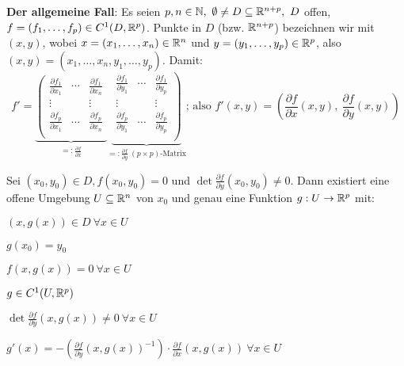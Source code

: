 \documentclass[a4paper,twoside,DIV15,BCOR12mm,chapterprefix=true,headings=twolinechapter]{scrbook}
\begin{document}
\textbf{Der allgemeine Fall}:
Es seien $p,n\in\MdN,\ \emptyset\ne D\subseteq\MdR^{n+p},\ D$ offen, $f=(f_1,\ldots, f_p) \in C^1(D,\mathbb{R}^p)$. Punkte in $D$ (bzw. $\mathbb{R}^{n+p}$) bezeichnen wir mit $(x,y)$, wobei $x=(x_1,\ldots, x_n)\in\mathbb{R}^n$ und $y=(y_1,\ldots, y_p)\in\mathbb{R}^p$, also $(x,y)=(x_1,\dots,x_n,y_1,\ldots,y_p)$. Damit:
$$ f'=
\underbrace{
\left(
\begin{array}{ccc|}
\frac{\partial f_1}{\partial x_1} & \cdots & \frac{\partial f_1}{\partial x_n} \\
\vdots & & \vdots \\
\frac{\partial f_p}{\partial x_1} & \cdots & \frac{\partial f_p}{\partial x_n} \\
\end{array}
\right.
}_{=:\frac{\partial f}{\partial x}}
\underbrace{
\left.
\begin{array}{ccc}
\frac{\partial f_1}{\partial y_1} & \cdots & \frac{\partial f_1}{\partial y_p} \\
\vdots & & \vdots \\
\frac{\partial f_p}{\partial y_1} & \cdots & \frac{\partial f_p}{\partial y_p} \\
\end{array}
\right)
}_{=:\frac{\partial f}{\partial y}\ (p\times p)\text{-Matrix}}
\text{; also } f'(x,y)=\left(\frac{\partial f}{\partial x}(x,y),\ \frac{\partial f}{\partial y}(x,y)\right)$$

\begin{satz}
Sei $(x_0, y_0)\in D, f(x_0, y_0)=0$ und $\det\frac{\partial f}{\partial y}(x_0, y_0)\ne 0$. Dann existiert eine offene Umgebung $U\subseteq \mathbb{R}^n$ von $x_0$ und genau eine Funktion $g:U\to\mathbb{R}^p$ mit:
\begin{liste}
\item $(x, g(x))\in D\ \forall x\in U$
\item $g(x_0)=y_0$
\item $f(x,g(x))=0\ \forall x\in U$
\item $g \in C^1(U,\mathbb{R}^p)$
\item $\det\frac{\partial f}{\partial y}(x, g(x))\ne0\ \forall x\in U$
\item $g'(x)=-\left(\frac{\partial f}{\partial y}(x, g(x))^{-1}\right) \cdot \frac{\partial f}{\partial x}(x, g(x))\ \forall x\in U$
\end{liste}
\end{satz}
\end{document}
